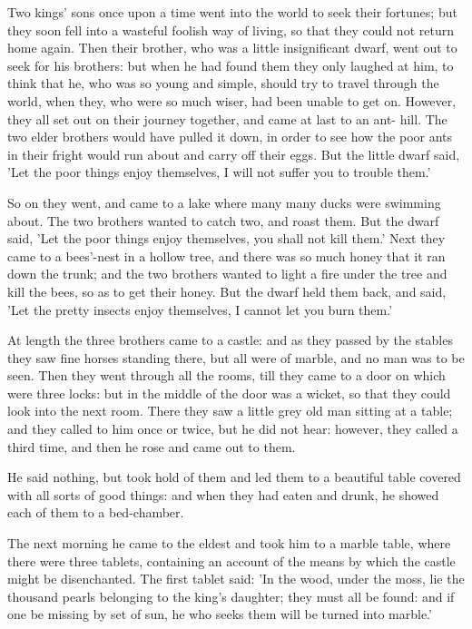 \documentclass[12pt]{book}
\begin{document}
Two kings' sons once upon a time went into the world to seek their
fortunes; but they soon fell into a wasteful foolish way of living, so
that they could not return home again. Then their brother, who was a
little insignificant dwarf, went out to seek for his brothers: but
when he had found them they only laughed at him, to think that he, who
was so young and simple, should try to travel through the world, when
they, who were so much wiser, had been unable to get on. However, they
all set out on their journey together, and came at last to an ant-
hill. The two elder brothers would have pulled it down, in order to
see how the poor ants in their fright would run about and carry off
their eggs. But the little dwarf said, 'Let the poor things enjoy
themselves, I will not suffer you to trouble them.'

So on they went, and came to a lake where many many ducks were
swimming about. The two brothers wanted to catch two, and roast them.
But the dwarf said, 'Let the poor things enjoy themselves, you shall
not kill them.' Next they came to a bees'-nest in a hollow tree, and
there was so much honey that it ran down the trunk; and the two
brothers wanted to light a fire under the tree and kill the bees, so
as to get their honey. But the dwarf held them back, and said, 'Let
the pretty insects enjoy themselves, I cannot let you burn them.'

At length the three brothers came to a castle: and as they passed by
the stables they saw fine horses standing there, but all were of
marble, and no man was to be seen. Then they went through all the
rooms, till they came to a door on which were three locks: but in the
middle of the door was a wicket, so that they could look into the next
room. There they saw a little grey old man sitting at a table; and
they called to him once or twice, but he did not hear: however, they
called a third time, and then he rose and came out to them.

He said nothing, but took hold of them and led them to a beautiful
table covered with all sorts of good things: and when they had eaten
and drunk, he showed each of them to a bed-chamber.

The next morning he came to the eldest and took him to a marble table,
where there were three tablets, containing an account of the means by
which the castle might be disenchanted. The first tablet said: 'In the
wood, under the moss, lie the thousand pearls belonging to the king's
daughter; they must all be found: and if one be missing by set of sun,
he who seeks them will be turned into marble.'
\end{document}
